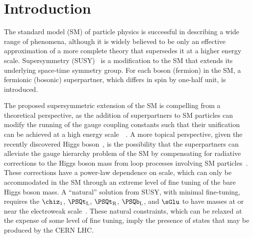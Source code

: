 \section{Introduction}
\label{sec:introduction}

The standard model (SM) of particle physics is successful in
describing a wide range of phenomena, although it is widely believed
to be only an effective approximation of a more complete theory that
supersedes it at a higher energy scale. Supersymmetry
(SUSY)~\cite{ref:SUSY-1, ref:SUSY0, ref:SUSY3, ref:SUSY1} is a
modification to the SM that extends its underlying space-time symmetry
group. For each boson (fermion) in the SM, a fermionic (bosonic)
superpartner, which differs in spin by one-half unit, is introduced.

The proposed supersymmetric extension of the SM is compelling from a
theoretical perspective, as the addition of superpartners to SM
particles can modify the running of the gauge coupling constants such
that their unification can be achieved at a high energy
scale~~\cite{Dimopoulos:1981yj, Ibanez:1981yh, Marciano:1981un}. A
more topical perspective, given the recently discovered Higgs
boson~\cite{ref:atlashiggsdiscovery, ref:cmshiggsdiscovery,
  ref:cmshiggsdiscoverylong}, is the possibility that the
superpartners can alleviate the gauge hierarchy problem of the SM by
compensating for radiative corrections to the Higgs boson mass from
loop processes involving SM particles~\cite{ref:hierarchy1,
  ref:hierarchy2}. These corrections have a power-law dependence on
scale, which can only be accommodated in the SM through an extreme
level of fine tuning of the bare Higgs boson mass. A ``natural''
solution from SUSY, with minimal fine-tuning, requires the $\chiz_1$,
$\PSQt_\text{L}$, $\PSQt_\text{R}$, $\PSQb_\text{L}$, and $\sGlu$ to
have masses at or near the electroweak
scale~\cite{ref:barbierinsusy}. These natural constraints, which can
be relaxed at the expense of some level of fine tuning, imply the
presence of states that may be produced by the CERN LHC.

